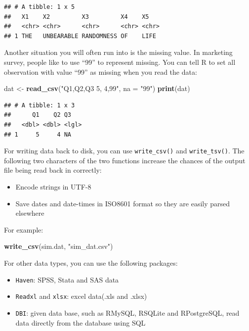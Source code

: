 \documentclass[12pt,]{krantz}
\makeatletter
\newenvironment{Shaded}{\begin{snugshade}}{\end{snugshade}}
\newcommand{\DataTypeTok}[1]{\textcolor[rgb]{0.27,0.27,0.27}{#1}}
\newcommand{\KeywordTok}[1]{\textcolor[rgb]{0.27,0.27,0.27}{\textbf{#1}}}
\newcommand{\NormalTok}[1]{#1}
\newcommand{\StringTok}[1]{\textcolor[rgb]{0.5,0.5,0.5}{#1}}
\providecommand{\tightlist}{%
  \setlength{\itemsep}{0pt}\setlength{\parskip}{0pt}}
\newenvironment{kframe}{%
\medskip{}
\setlength{\fboxsep}{.8em}
 \def\at@end@of@kframe{}%
 \ifinner\ifhmode%
  \def\at@end@of@kframe{\end{minipage}}%
  \begin{minipage}{\columnwidth}%
 \fi\fi%
 \def\FrameCommand##1{\hskip\@totalleftmargin \hskip-\fboxsep
 \colorbox{shadecolor}{##1}\hskip-\fboxsep
     \hskip-\linewidth \hskip-\@totalleftmargin \hskip\columnwidth}%
 \MakeFramed {\advance\hsize-\width
   \@totalleftmargin\z@ \linewidth\hsize
   \@setminipage}}%
 {\par\unskip\endMakeFramed%
 \at@end@of@kframe}
\renewenvironment{Shaded}{\begin{kframe}}{\end{kframe}}
\makeatother
\begin{document}
\begin{verbatim}
## # A tibble: 1 x 5
##   X1    X2         X3         X4    X5   
##   <chr> <chr>      <chr>      <chr> <chr>
## 1 THE   UNBEARABLE RANDOMNESS OF    LIFE
\end{verbatim}

Another situation you will often run into is the missing value. In marketing survey, people like to use ``99'' to represent missing. You can tell R to set all observation with value ``99'' as missing when you read the data:

\begin{Shaded}
\begin{Highlighting}[]
\NormalTok{dat <-}\StringTok{ }\KeywordTok{read_csv}\NormalTok{(}\StringTok{"Q1,Q2,Q3}
\StringTok{               5, 4,99"}\NormalTok{, }
               \DataTypeTok{na =} \StringTok{"99"}\NormalTok{)}
\KeywordTok{print}\NormalTok{(dat)}
\end{Highlighting}
\end{Shaded}

\begin{verbatim}
## # A tibble: 1 x 3
##      Q1    Q2 Q3   
##   <dbl> <dbl> <lgl>
## 1     5     4 NA
\end{verbatim}

For writing data back to disk, you can use \texttt{write\_csv()} and \texttt{write\_tsv()}. The following two characters of the two functions increase the chances of the output file being read back in correctly:

\begin{itemize}
\tightlist
\item
  Encode strings in UTF-8
\item
  Save dates and date-times in ISO8601 format so they are easily parsed elsewhere
\end{itemize}

For example:

\begin{Shaded}
\begin{Highlighting}[]
\KeywordTok{write_csv}\NormalTok{(sim.dat, }\StringTok{"sim_dat.csv"}\NormalTok{)}
\end{Highlighting}
\end{Shaded}

For other data types, you can use the following packages:

\begin{itemize}
\tightlist
\item
  \texttt{Haven}: SPSS, Stata and SAS data
\item
  \texttt{Readxl} and \texttt{xlsx}: excel data(.xls and .xlsx)
\item
  \texttt{DBI}: given data base, such as RMySQL, RSQLite and RPostgreSQL, read data directly from the database using SQL
\end{itemize}
\end{document}
